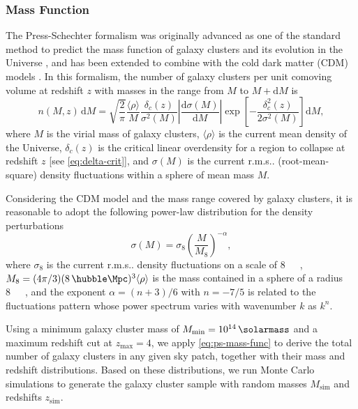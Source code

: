 \documentclass[modern]{aastex62}
\makeatletter
\newcommand{\R}[1]{\mathrm{#1}}
\newcommand{\D}[1]{\R{d} #1}
\newcommand{\diff}[2]{\frac{\D{#1}}{\D{#2}}}
\newcommand{\rms}{r.m.s\@ifnextchar.{}{.\@}}
\makeatother
\begin{document}
\subsubsection{Mass Function}
\label{sec:mass-function}

The Press-Schechter formalism was originally advanced as one of the standard
method to predict the mass function of galaxy clusters and its evolution
in the Universe \citep{press1974}, and has been extended to combine with
the cold dark matter (CDM) models \citep[e.g.,][]{bond1991,lacey1993}.
In this formalism, the number of galaxy clusters per unit comoving volume
at redshift $z$ with masses in the range from $M$ to $M + \R{d}M$ is
\begin{equation}
  \label{eq:ps-mass-func}
  n(M, z) \,\D{M} = \sqrt{\frac{2}{\pi}} \frac{\langle{\rho}\rangle}{M}
  \frac{\delta_c(z)}{\sigma^2(M)} \left| \diff{\sigma(M)}{M} \right|
  \exp\!\left[ -\frac{\delta_c^2(z)}{2\sigma^2(M)} \right] \D{M},
\end{equation}
where $M$ is the virial mass of galaxy clusters,
$\langle {\rho} \rangle$ is the current mean density of the Universe,
$\delta_c(z)$ is the critical linear overdensity for a region to collapse
at redshift $z$ [see \autoref{eq:delta-crit}],
and $\sigma(M)$ is the current \rms{} (root-mean-square) density
fluctuations within a sphere of mean mass $M$.

Considering the CDM model and the mass range covered by galaxy clusters,
it is reasonable to adopt the following power-law distribution for the
density perturbations \citep{sarazin2002,randall2002}
\begin{equation}
  \label{eq:sigma-mass}
  \sigma(M) = \sigma_8 \left( \frac{M}{M_8} \right)^{-\alpha},
\end{equation}
where $\sigma_8$ is the current \rms{} density fluctuations on
a scale of \SI{8}{\per\hubble\Mpc},
$M_8 = (4\pi/3)(8 \,\si{\per\hubble\Mpc})^3 \langle{\rho}\rangle$
is the mass contained in a sphere of a radius \SI{8}{\per\hubble\Mpc},
and the exponent $\alpha = (n+3)/6$ with $n = -7/5$ \citep{randall2002}
is related to the fluctuations pattern whose power spectrum varies
with wavenumber $k$ as $k^n$.

Using a minimum galaxy cluster mass of
$M_{\R{min}} = \SI{e14}{\solarmass}$
and a maximum redshift cut at $z_{\R{max}} = 4$,
we apply \autoref{eq:ps-mass-func} to derive the total number of
galaxy clusters in any given sky patch, together with their mass and
redshift distributions.
Based on these distributions, we run Monte Carlo simulations to
generate the galaxy cluster sample with random masses
$M_{\R{sim}}$ and redshifts $z_{\R{sim}}$.
\end{document}
